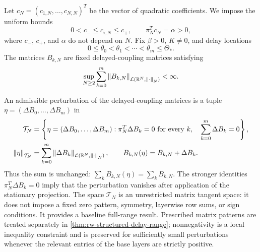Let \(c_N=(c_{1,N},\ldots,c_{N,N})^T\) be the vector of quadratic
coefficients.  We impose the uniform bounds
\begin{equation}
 0<c_-\leq c_{i,N}\leq c_+,
 \qquad \pi_N^Tc_N=\alpha>0,
 \label{eq:rw-curvature-assumptions}
\end{equation}
where \(c_-\), \(c_+\), and \(\alpha\) do not depend on \(N\).  Fix
\(\beta>0\), \(K\neq0\), and delay locations
\begin{equation}
 0\leq\theta_0<\theta_1<\cdots<\theta_m\leq\Theta_*.
 \label{eq:rw-delay-support}
\end{equation}
The matrices \(B_{k,N}\) are fixed delayed-coupling matrices satisfying
\begin{equation}
 \sup_{N\geq2}\sum_{k=0}^m
 \left\lVert B_{k,N}\right\rVert_{\mathcal L(\mathbb R^N,\left\lVert\cdot\right\rVert_N)}<\infty.
 \label{eq:rw-base-layer-bound}
\end{equation}

An admissible perturbation of the delayed-coupling matrices is a tuple
\(\eta=(\Delta B_0,\ldots,\Delta B_m)\) in
\begin{align}
 \mathcal T_N
 &=\left\{\eta=(\Delta B_0,\ldots,\Delta B_m):
       \pi_N^T\Delta B_k=0\ \text{for every }k,
       \quad \sum_{k=0}^m\Delta B_k=0\right\},
 \label{eq:rw-structural-parameter-space}\\
 \left\lVert\eta\right\rVert_{\mathcal T_N}
 &=\sum_{k=0}^m
   \left\lVert\Delta B_k\right\rVert_{\mathcal L(\mathbb R^N,\left\lVert\cdot\right\rVert_N)},
 \qquad B_{k,N}(\eta)=B_{k,N}+\Delta B_k.
 \label{eq:rw-structural-parameter-norm}
\end{align}
Thus the sum is unchanged:
\(\sum_kB_{k,N}(\eta)=\sum_kB_{k,N}\).  The stronger identities
\(\pi_N^T\Delta B_k=0\) imply that the perturbation vanishes after application of
the stationary projection.
The space \(\mathcal T_N\) is an unrestricted matrix tangent space: it does
not impose a fixed zero pattern, symmetry, layerwise row sums, or sign
conditions.  It provides a baseline full-range result.  Prescribed matrix
patterns are treated separately in
\cref{thm:rw-structured-delay-range}; nonnegativity is a local inequality
constraint and is preserved for sufficiently small perturbations whenever
the relevant entries of the base layers are strictly positive.

